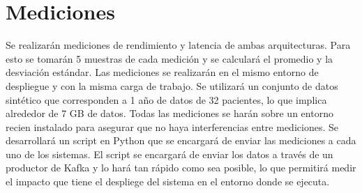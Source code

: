 \section{Mediciones}

Se realizarán mediciones de rendimiento y latencia de ambas arquitecturas.
Para esto se tomarán 5 muestras de cada medición y se calculará el promedio y la desviación estándar.
Las mediciones se realizarán en el mismo entorno de despliegue y con la misma carga de trabajo.
Se utilizará un conjunto de datos sintético que corresponden a 1 año de datos de 32 pacientes,
lo que implica alrededor de 7 GB de datos. 
Todas las mediciones se harán sobre un entorno recien instalado para asegurar que no haya interferencias entre mediciones.
Se desarrollará un script en Python que se encargará de enviar las mediciones a cada uno de los sistemas.
El script se encargará de enviar los datos a través de un productor de Kafka y lo hará tan rápido como sea posible,
lo que permitirá medir el impacto que tiene el despliege del sistema en el entorno donde se ejecuta.

\newpage